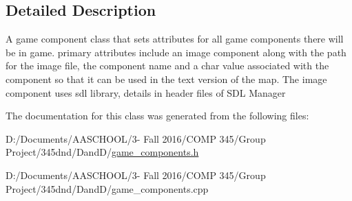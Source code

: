 \subsection{Detailed Description}
A game component class that sets attributes for all game components there will be in game. primary attributes include an image component along with the path for the image file, the component name and a char value associated with the component so that it can be used in the text version of the map. The image component uses sdl library, details in header files of S\+DL Manager 

The documentation for this class was generated from the following files\+:\begin{DoxyCompactItemize}
\item 
D\+:/\+Documents/\+A\+A\+S\+C\+H\+O\+O\+L/3-\/ Fall 2016/\+C\+O\+M\+P 345/\+Group Project/345dnd/\+Dand\+D/\hyperlink{game__components_8h}{game\+\_\+components.\+h}\item 
D\+:/\+Documents/\+A\+A\+S\+C\+H\+O\+O\+L/3-\/ Fall 2016/\+C\+O\+M\+P 345/\+Group Project/345dnd/\+Dand\+D/game\+\_\+components.\+cpp\end{DoxyCompactItemize}
